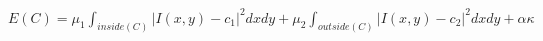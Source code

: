 \documentclass[class=minimal,border=2pt]{standalone}
\begin{document}
  $E(C) = \mu_1 \int_{inside(C)} \! |I(x,y)-c_1|^2dxdy + \mu_2 \int_{outside(C)} \!
  |I(x,y)-c_2|^2dxdy +  \alpha\kappa$
\end{document}
